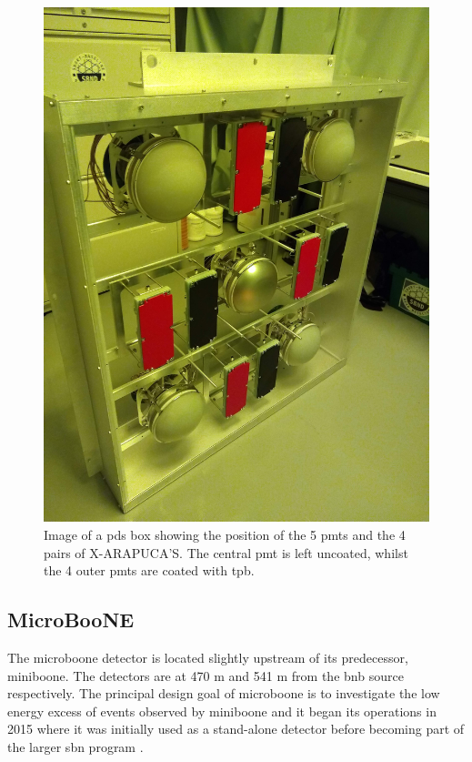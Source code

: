 \begin{figure}[!h]
    \centering
    \includegraphics[width = \mediumfigwidth]{figures-chap3/PDS_box_2.jpg}
    \caption[Image of PDS box.]{Image of a \gls{pds} box showing the position of the 5 \glspl{pmt} and the 4 pairs of X-ARAPUCA'S. The central \gls{pmt} is left uncoated, whilst the 4 outer \glspl{pmt} are coated with \gls{tpb}.} %
    \label{fig:pds_box}
\end{figure}

\newpage
\subsection{MicroBooNE}\label{sec:MicroBooNE}
The \gls{microboone} detector is located slightly upstream of its predecessor, \gls{miniboone}. The detectors are at 470 m and 541 m from the \gls{bnb} source respectively. The principal design goal of \gls{microboone} is to investigate the low energy excess of events observed by \gls{miniboone} and it began its operations in 2015 where it was initially used as a stand-alone detector before becoming part of the larger \gls{sbn} program \cite{microboone_detector}.

